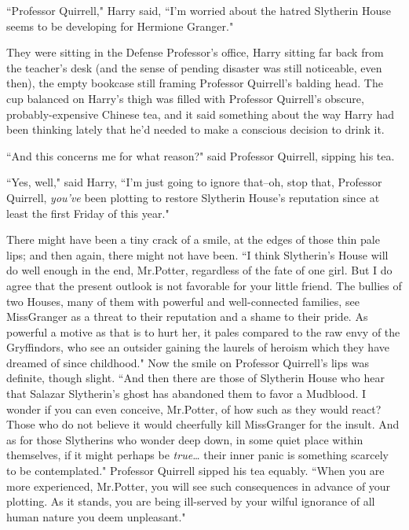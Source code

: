 \later

``Professor Quirrell," Harry said, ``I'm worried about the hatred Slytherin House seems to be developing for Hermione Granger."

They were sitting in the Defense Professor's office, Harry sitting far back from the teacher's desk (and the sense of pending disaster was still noticeable, even then), the empty bookcase still framing Professor Quirrell's balding head. The cup balanced on Harry's thigh was filled with Professor Quirrell's obscure, probably-expensive Chinese tea, and it said something about the way Harry had been thinking lately that he'd needed to make a conscious decision to drink it.

``And this concerns me for what reason?" said Professor Quirrell, sipping his tea.

``Yes, well," said Harry, ``I'm just going to ignore that\---oh, stop that, Professor Quirrell, \emph{you've} been plotting to restore Slytherin House's reputation since at least the first Friday of this year."

There might have been a tiny crack of a smile, at the edges of those thin pale lips; and then again, there might not have been. ``I think Slytherin's House will do well enough in the end, Mr.\?Potter, regardless of the fate of one girl. But I do agree that the present outlook is not favorable for your little friend. The bullies of two Houses, many of them with powerful and well-connected families, see Miss\?Granger as a threat to their reputation and a shame to their pride. As powerful a motive as that is to hurt her, it pales compared to the raw envy of the Gryffindors, who see an outsider gaining the laurels of heroism which they have dreamed of since childhood." Now the smile on Professor Quirrell's lips was definite, though slight. ``And then there are those of Slytherin House who hear that Salazar Slytherin's ghost has abandoned them to favor a Mudblood. I wonder if you can even conceive, Mr.\?Potter, of how such as they would react? Those who do not believe it would cheerfully kill Miss\?Granger for the insult. And as for those Slytherins who wonder deep down, in some quiet place within themselves, if it might perhaps be \emph{true{\ldots}} their inner panic is something scarcely to be contemplated." Professor Quirrell sipped his tea equably. ``When you are more experienced, Mr.\?Potter, you will see such consequences in advance of your plotting. As it stands, you are being ill-served by your wilful ignorance of all human nature you deem unpleasant."

